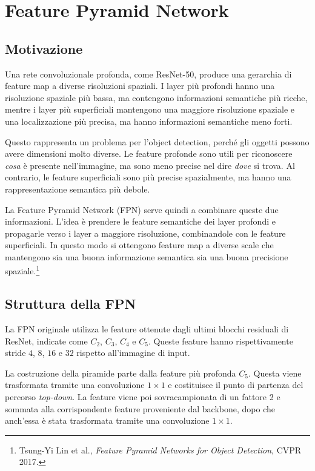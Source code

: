 \section{Feature Pyramid Network}

\subsection{Motivazione}

Una rete convoluzionale profonda, come ResNet-50, produce una gerarchia di
feature map a diverse risoluzioni spaziali. I layer più profondi hanno una
risoluzione spaziale più bassa, ma contengono informazioni semantiche più
ricche, mentre i layer più superficiali mantengono una maggiore risoluzione
spaziale e una localizzazione più precisa, ma hanno informazioni semantiche
meno forti.

Questo rappresenta un problema per l'object detection, perché gli oggetti
possono avere dimensioni molto diverse. Le feature profonde sono utili per
riconoscere \textit{cosa} è presente nell'immagine, ma sono meno precise nel
dire \textit{dove} si trova. Al contrario, le feature superficiali sono più
precise spazialmente, ma hanno una rappresentazione semantica più debole.

La Feature Pyramid Network (FPN) serve quindi a combinare queste due
informazioni. L'idea è prendere le feature semantiche dei layer profondi e
propagarle verso i layer a maggiore risoluzione, combinandole con le feature
superficiali. In questo modo si ottengono feature map a diverse scale che
mantengono sia una buona informazione semantica sia una buona precisione
spaziale.\footnote{Tsung-Yi Lin et al., \textit{Feature Pyramid Networks for
Object Detection}, CVPR 2017.}

\subsection{Struttura della FPN}

La FPN originale utilizza le feature ottenute dagli ultimi blocchi residuali
di ResNet, indicate come $C_2$, $C_3$, $C_4$ e $C_5$. Queste feature hanno
rispettivamente stride $4$, $8$, $16$ e $32$ rispetto all'immagine di input.

La costruzione della piramide parte dalla feature più profonda $C_5$. Questa
viene trasformata tramite una convoluzione $1\times1$ e costituisce il punto
di partenza del percorso \textit{top-down}. La feature viene poi
sovracampionata di un fattore 2 e sommata alla corrispondente feature
proveniente dal backbone, dopo che anch'essa è stata trasformata tramite una
convoluzione $1\times1$.

